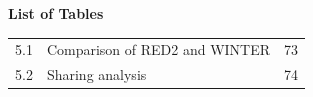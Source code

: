 \clearpage
\thispagestyle{plain}
\begin{center}
\textbf{List of Tables}
\end{center}

\vspace{0.3in}

\begin{tabular}{@{}p{0.55in}p{4.55in}r@{}}
5.1 & Comparison of RED2 and WINTER & 73\\
5.2 & Sharing analysis & 74\\
\end{tabular}
